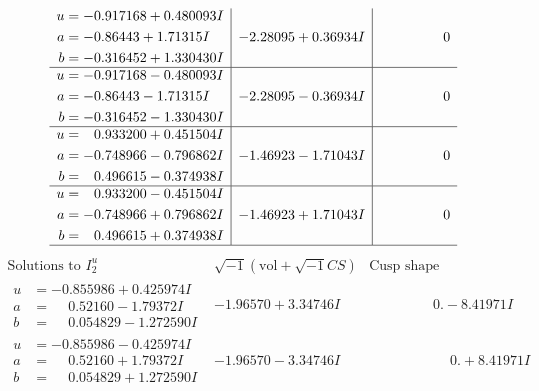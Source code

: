 \documentclass[1p]{elsarticle_modified}
\theoremstyle{definition}
\newcommand{\I}{\sqrt{-1}}
\begin{document}
$$\begin{array}{c|c|c}
\begin{aligned}
u &= -0.917168 + 0.480093 I \\
a &= -0.86443 + 1.71315 I \\
b &= -0.316452 + 1.330430 I\end{aligned}
 & -2.28095 + 0.36934 I & \phantom{-0.000000 } 0 \\ \hline\begin{aligned}
u &= -0.917168 - 0.480093 I \\
a &= -0.86443 - 1.71315 I \\
b &= -0.316452 - 1.330430 I\end{aligned}
 & -2.28095 - 0.36934 I & \phantom{-0.000000 } 0 \\ \hline\begin{aligned}
u &= \phantom{-}0.933200 + 0.451504 I \\
a &= -0.748966 - 0.796862 I \\
b &= \phantom{-}0.496615 - 0.374938 I\end{aligned}
 & -1.46923 - 1.71043 I & \phantom{-0.000000 } 0 \\ \hline\begin{aligned}
u &= \phantom{-}0.933200 - 0.451504 I \\
a &= -0.748966 + 0.796862 I \\
b &= \phantom{-}0.496615 + 0.374938 I\end{aligned}
 & -1.46923 + 1.71043 I & \phantom{-0.000000 } 0\\
 \hline 
 \end{array}$$\newpage$$\begin{array}{c|c|c}  
\text{Solutions to }I^u_{2}& \I (\text{vol} + \sqrt{-1}CS) & \text{Cusp shape}\\
 \hline 
\begin{aligned}
u &= -0.855986 + 0.425974 I \\
a &= \phantom{-}0.52160 - 1.79372 I \\
b &= \phantom{-}0.054829 - 1.272590 I\end{aligned}
 & -1.96570 + 3.34746 I & \phantom{-0.000000 } 0. - 8.41971 I \\ \hline\begin{aligned}
u &= -0.855986 - 0.425974 I \\
a &= \phantom{-}0.52160 + 1.79372 I \\
b &= \phantom{-}0.054829 + 1.272590 I\end{aligned}
 & -1.96570 - 3.34746 I & \phantom{-0.000000 -}0. + 8.41971 I \\ \hline\begin{aligned}

\end{aligned}
\end{array}$$
\end{document}
